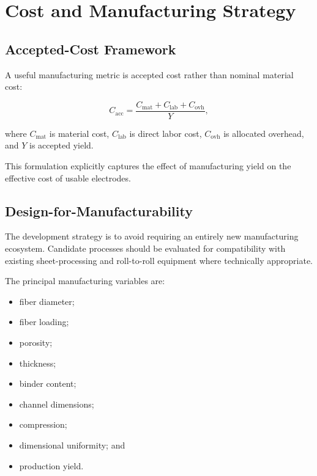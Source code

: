 \documentclass[11pt,letterpaper]{article}
\begin{document}

\section{Cost and Manufacturing Strategy}

\subsection{Accepted-Cost Framework}

A useful manufacturing metric is accepted cost rather than nominal material
cost:

\begin{equation}
C_{\mathrm{acc}}
=
\frac{
C_{\mathrm{mat}}
+
C_{\mathrm{lab}}
+
C_{\mathrm{ovh}}
}{Y},
\label{eq:accepted-cost}
\end{equation}

where $C_{\mathrm{mat}}$ is material cost, $C_{\mathrm{lab}}$ is direct
labor cost, $C_{\mathrm{ovh}}$ is allocated overhead, and $Y$ is accepted
yield.

This formulation explicitly captures the effect of manufacturing yield on
the effective cost of usable electrodes.

\subsection{Design-for-Manufacturability}

The development strategy is to avoid requiring an entirely new manufacturing
ecosystem. Candidate processes should be evaluated for compatibility with
existing sheet-processing and roll-to-roll equipment where technically
appropriate.

The principal manufacturing variables are:

\begin{itemize}
    \item fiber diameter;
    \item fiber loading;
    \item porosity;
    \item thickness;
    \item binder content;
    \item channel dimensions;
    \item compression;
    \item dimensional uniformity; and
    \item production yield.
\end{itemize}
\end{document}
